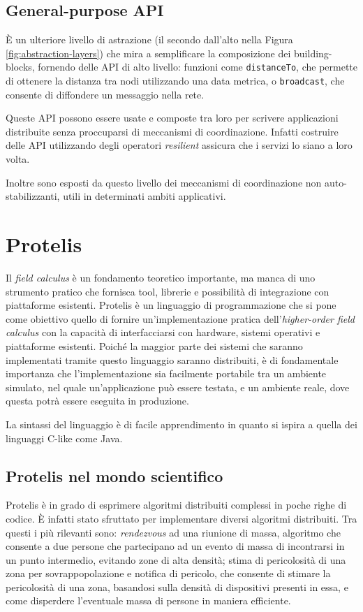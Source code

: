 \subsection{General-purpose API}
È un ulteriore livello di astrazione (il secondo dall'alto nella Figura
\ref{fig:abstraction-layers}) che mira a semplificare la composizione dei
building-blocks, fornendo delle API di alto livello\cite{amslaurea13090}: funzioni come
\texttt{distanceTo}, che permette di ottenere la distanza tra nodi utilizzando
una data metrica, o \texttt{broadcast}, che consente di diffondere un messaggio
nella rete.

Queste API possono essere usate e composte tra loro per scrivere applicazioni
distribuite senza proccuparsi di meccanismi di coordinazione. Infatti costruire
delle API utilizzando degli operatori \textit{resilient} assicura che i servizi
lo siano a loro volta.

Inoltre sono esposti da questo livello dei meccanismi di coordinazione non
auto-stabilizzanti, utili in determinati ambiti applicativi.

\section{Protelis}
Il \textit{field calculus} è un fondamento teoretico importante, ma manca di uno
strumento pratico che fornisca tool, librerie e possibilità di integrazione con
piattaforme esistenti. Protelis\cite{Protelis} è un linguaggio di programmazione
che si pone come obiettivo quello di fornire un'implementazione pratica
dell'\textit{higher-order field calculus}\cite{Audrito:2019:HCC:3301291.3285956}
con la capacità di interfacciarsi con hardware, sistemi operativi e piattaforme
esistenti. Poiché la maggior parte dei sistemi che saranno implementati tramite
questo linguaggio saranno distribuiti, è di fondamentale importanza che
l'implementazione sia facilmente portabile tra un ambiente simulato, nel quale
un'applicazione può essere testata, e un ambiente reale, dove questa potrà
essere eseguita in produzione.

La sintassi del linguaggio è di facile apprendimento in quanto si ispira a
quella dei linguaggi C-like come Java.

\subsection{Protelis nel mondo scientifico}
Protelis è in grado di esprimere algoritmi distribuiti complessi in poche righe
di codice. È infatti stato sfruttato per implementare diversi algoritmi
distribuiti. Tra questi i più rilevanti sono: \textit{rendezvous} ad una
riunione di massa\cite{Protelis}, algoritmo che consente a due persone che
partecipano ad un evento di massa di incontrarsi in un punto intermedio,
evitando zone di alta densità; stima di pericolosità di una zona per
sovrappopolazione e notifica di pericolo\cite{7056345}, che consente di stimare
la pericolosità di una zona, basandosi sulla densità di dispositivi presenti in
essa, e come disperdere l'eventuale massa di persone in maniera efficiente.

